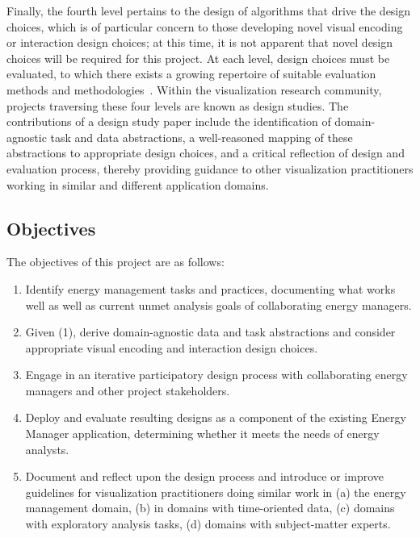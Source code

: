 Finally, the fourth level pertains to the design of algorithms that drive the design choices, which is of particular concern to those developing novel visual encoding or interaction design choices; at this time, it is not apparent that novel design choices will be required for this project. 
At each level, design choices must be evaluated, to which there exists a growing repertoire of suitable evaluation methods and methodologies~\cite{Lam2012,Meyer2015}. 
Within the visualization research community, projects traversing these four levels are known as design studies. 
The contributions of a design study paper include the identification of domain-agnostic task and data abstractions, a well-reasoned mapping of these abstractions to appropriate design choices, and a critical reflection of design and evaluation process, thereby providing guidance to other visualization practitioners working in similar and different application domains.

\subsection{Objectives}
\label{app:emu:proposal-objectives}

The objectives of this project are as follows:

\begin{enumerate}
    \item Identify energy management tasks and practices, documenting what works well as well as current unmet analysis goals of collaborating energy managers.
    \item Given (1), derive domain-agnostic data and task abstractions and consider appropriate visual encoding and interaction design choices.
    \item Engage in an iterative participatory design process with collaborating energy managers and other project stakeholders.
    \item Deploy and evaluate resulting designs as a component of the existing Energy Manager application, determining whether it meets the needs of energy analysts.
    \item Document and reflect upon the design process and introduce or improve guidelines for visualization practitioners doing similar work in (a) the energy management domain, (b) in domains with time-oriented data, (c) domains with exploratory analysis tasks, (d) domains with subject-matter experts.
\end{enumerate}

